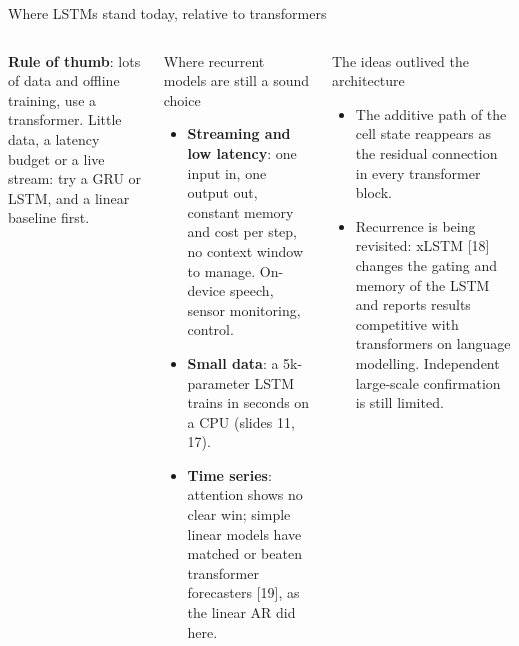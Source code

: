 \documentclass[aspectratio=169,10pt]{beamer}
\renewcommand{\cite}[1]{{\scriptsize\color{cTok}[#1]}}
\begin{document}
\begin{frame}{Where LSTMs stand today, relative to transformers}
\begin{columns}[T,onlytextwidth]
\vspace{0.5mm}
\textbf{Rule of thumb}: lots of data and offline training, use a transformer. Little data,
a latency budget or a live stream: try a GRU or LSTM, and a linear baseline first.
\small
\begin{block}{Where recurrent models are still a sound choice}
\footnotesize
\begin{itemize}
  \item \textbf{Streaming and low latency}: one input in, one output out, constant memory and
        cost per step, no context window to manage. On-device speech, sensor monitoring, control.
  \item \textbf{Small data}: a 5k-parameter LSTM trains in seconds on a CPU (slides 11, 17).
  \item \textbf{Time series}: attention shows no clear win; simple linear models have matched or
        beaten transformer forecasters \cite{19}, as the linear AR did here.
\end{itemize}
\end{block}
\begin{block}{The ideas outlived the architecture}
\footnotesize
\begin{itemize}
  \item The additive path of the cell state reappears as the residual connection in every
        transformer block.
  \item Recurrence is being revisited: xLSTM \cite{18} changes the gating and memory of the LSTM
        and reports results competitive with transformers on language modelling. Independent
        large-scale confirmation is still limited.
\end{itemize}
\end{block}

\end{columns}
\end{frame}
\end{document}
